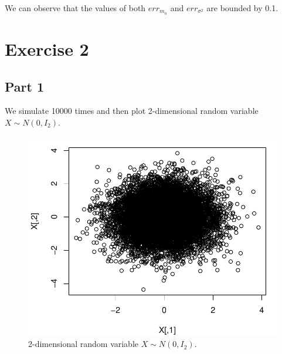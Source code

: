 \documentclass[12pt, a4paper]{article}\usepackage[]{graphicx}\usepackage[]{color}
\makeatletter
\def\maxwidth{ %
  \ifdim\Gin@nat@width>\linewidth
    \linewidth
  \else
    \Gin@nat@width
  \fi
}
\newenvironment{knitrout}{}{} %
\makeatother
\begin{document}
We can observe that the values of both $err_{m_n}$ and $err_{\sigma^2}$ are bounded by 0.1.
















\section{Exercise 2}

\subsection{Part 1}
We simulate 10000 times and then plot 2-dimensional random variable $X\sim N(0,I_2)$.

\begin{knitrout}
\color{fgcolor}\begin{figure}[H]

{\centering \includegraphics[width=\maxwidth]{figure/ex2X-1} 

}

\caption[2-dimensional random variable $X \sim N(0,I_2)$]{2-dimensional random variable $X \sim N(0,I_2)$.}\label{fig:ex2X}
\end{figure}


\end{knitrout}
\end{document}
